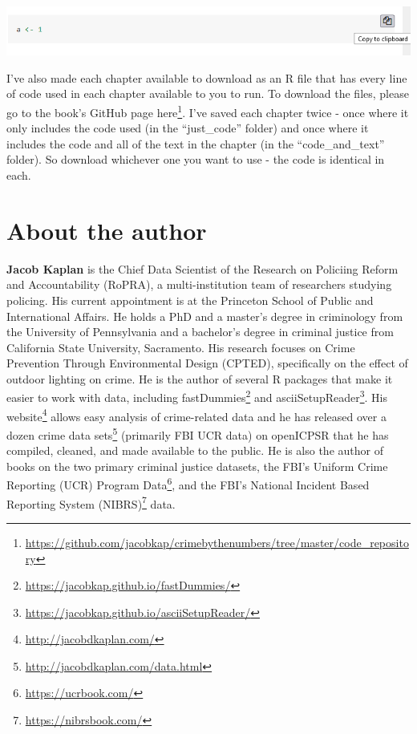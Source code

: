 \documentclass[
]{krantz}
\renewcommand{\href}[2]{#2\footnote{\url{#1}}}
\begin{document}
\begin{center}\includegraphics[width=0.9\linewidth]{images/copy_code} \end{center}

I've also made each chapter available to download as an R file that has every line of code used in each chapter available to you to run. To download the files, please go to the book's GitHub page \href{https://github.com/jacobkap/crimebythenumbers/tree/master/code_repository}{here}. I've saved each chapter twice - once where it only includes the code used (in the ``just\_code'' folder) and once where it includes the code and all of the text in the chapter (in the ``code\_and\_text'' folder). So download whichever one you want to use - the code is identical in each.

\hypertarget{about-the-author}{%
\chapter*{About the author}\label{about-the-author}}


\textbf{Jacob Kaplan} is the Chief Data Scientist of the Research on Policiing Reform and Accountability (RoPRA), a multi-institution team of researchers studying policing. His current appointment is at the Princeton School of Public and International Affairs. He holds a PhD and a master's degree in criminology from the University of Pennsylvania and a bachelor's degree in criminal justice from California State University, Sacramento. His research focuses on Crime Prevention Through Environmental Design (CPTED), specifically on the effect of outdoor lighting on crime. He is the author of several R packages that make it easier to work with data, including \href{https://jacobkap.github.io/fastDummies/}{fastDummies} and \href{https://jacobkap.github.io/asciiSetupReader/}{asciiSetupReader}. His \href{http://jacobdkaplan.com/}{website} allows easy analysis of crime-related data and he has released over a \href{http://jacobdkaplan.com/data.html}{dozen crime data sets} (primarily FBI UCR data) on openICPSR that he has compiled, cleaned, and made available to the public. He is also the author of books on the two primary criminal justice datasets, the FBI's \href{https://ucrbook.com/}{Uniform Crime Reporting (UCR) Program Data}, and the FBI's \href{https://nibrsbook.com/}{National Incident Based Reporting System (NIBRS)} data.
\end{document}
